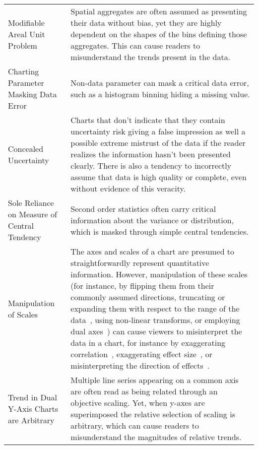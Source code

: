 \begin{longtable}{p{3cm}p{14cm}}
 \rowcolor{colorc}Modifiable Areal Unit Problem  & Spatial aggregates are often assumed as presenting their data without bias, yet they are highly dependent on the shapes of the bins defining those aggregates. This can cause readers to misunderstand the trends present in the data. \cite{fotheringham1991modifiable, kindlmann2014algebraic}\\
 \rowcolor{colorc-opaque}Charting Parameter Masking Data Error & Non-data parameter can mask a critical data error, such as a histogram binning hiding a missing value. \cite{correll2018looks}\\
 \rowcolor{colorc}Concealed Uncertainty  & Charts that don't indicate that they contain uncertainty risk giving a false impression as well a possible extreme mistrust of the data if the reader realizes the information hasn't been presented clearly. There is also a tendency to incorrectly assume that data is high quality or complete, even without evidence of this veracity. \cite{song2018s, few2019loom, mayrTrust2019, sacha2015role}\\
 \rowcolor{colorc-opaque}Sole Reliance on Measure of Central Tendency & Second order statistics often carry critical information about the variance or distribution, which is masked through simple central tendencies.  \cite{wall2017warning, few2019loom, matejka2017same, anscombe1973graphs}\\
 \rowcolor{colorc}Manipulation of Scales & The axes and scales of a chart are presumed to straightforwardly represent quantitative information. However, manipulation of these scales (for instance, by flipping them from their commonly assumed directions, truncating or expanding them with respect to the range of the data~\cite{pandey2015deceptive, correll2017black, cleveland1982variables, ritchie2019lie, correll2019truncating}, using non-linear transforms, or employing dual axes~\cite{KindlmannAlgebraicVisPedagogyPDV2016, cairo2015graphics}) can cause viewers to misinterpret the data in a chart, for instance by exaggerating correlation~\cite{cleveland1982variables}, exaggerating effect size~\cite{correll2019truncating,pandey2015deceptive}, or misinterpreting the direction of effects~\cite{pandey2015deceptive}. \cite{cairo2015graphics,correll2017black,correll2019truncating,cleveland1982variables,KindlmannAlgebraicVisPedagogyPDV2016,pandey2015deceptive,ritchie2019lie}\\
 \rowcolor{colorc-opaque}Trend in Dual Y-Axis Charts are Arbitrary  & Multiple line series appearing on a common axis are often read as being related through an objective scaling. Yet, when y-axes are superimposed the relative selection of scaling is arbitrary, which can cause readers to misunderstand the magnitudes of relative trends. \cite{KindlmannAlgebraicVisPedagogyPDV2016, cairo2015graphics}\\

\end{longtable}
